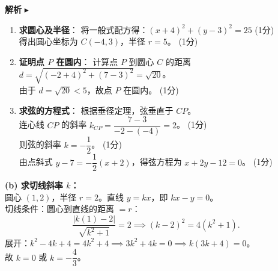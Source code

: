 \documentclass[12pt,a4paper]{exam-zh}
\begin{document}
\begin{solution}
\textbf{解析} $\blacktriangleright$
    
    \begin{enumerate}[label=(\alph*)]
        \item \textbf{求圆心及半径}：
        将一般式配方得：$(x + 4)^2 + (y - 3)^2 = 25$ \hfill (1分) \\
        得出圆心坐标为 $C(-4, 3)$，半径 $r = 5$。 \hfill (1分)

        \item \textbf{证明点 $P$ 在圆内}：
        计算点 $P$ 到圆心 $C$ 的距离 $d = \sqrt{(-2+4)^2 + (7-3)^2} = \sqrt{20}$。 \\
        由于 $d = \sqrt{20} < 5$，故点 $P$ 在圆内。 \hfill (1分)

        \item \textbf{求弦的方程式}：
        根据垂径定理，弦垂直于 $CP$。 \\ 
        连心线 $CP$ 的斜率 $k_{CP} = \dfrac{7 - 3}{-2 - (-4)} = 2$。 \hfill (1分) \\
        则弦的斜率 $k = -\dfrac{1}{2}$。 \hfill (1分) \\
        由点斜式 $y - 7 = -\dfrac{1}{2}(x + 2)$，得弦方程为 $x + 2y - 12 = 0$。 \hfill (1分)
    \end{enumerate}

    \textbf{(b) 求切线斜率 $k$：} \\
    圆心 $(1, 2)$，半径 $r = 2$。直线 $y = kx$，即 $kx - y = 0$。\\
    切线条件：圆心到直线的距离 $= r$：
    \[
        \frac{|k(1) - 2|}{\sqrt{k^2+1}} = 2 \implies (k-2)^2 = 4(k^2+1).
    \]
    展开：$k^2 - 4k + 4 = 4k^2 + 4 \implies 3k^2 + 4k = 0 \implies k(3k + 4) = 0$。\\
    故 $k = 0$ 或 $k = -\dfrac{4}{3}$。
\end{solution}
\end{document}
